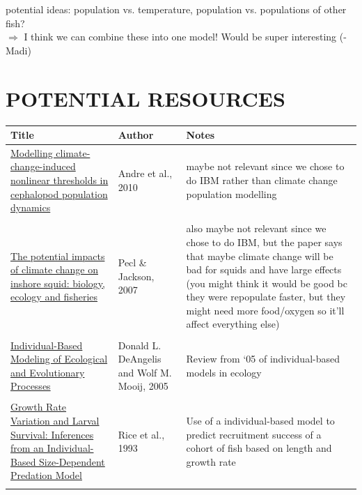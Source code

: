 \documentclass[12pt]{article}
\begin{document}
potential ideas: population vs. temperature, population vs. populations of other fish?
\\$\Rightarrow$ I think we can combine these into one model! Would be super interesting (-Madi)


\section{POTENTIAL RESOURCES} %
\begin{longtable}{p{2.0in}|p{1.0in}|p{2.5in}}
    \centering
         Title  & Author & Notes \\ \hline
        \href{https://onlinelibrary.wiley.com/doi/abs/10.1111/j.1365-2486.2010.02223.x}{Modelling climate-change-induced nonlinear thresholds in cephalopod population dynamics} & Andre et al., 2010 & maybe not relevant since we chose to do IBM rather than climate change population modelling \\ \\
        \href{https://link.springer.com/article/10.1007/s11160-007-9077-3}{The potential impacts of climate change on inshore squid: biology, ecology and fisheries} & Pecl \& Jackson, 2007 & also maybe not relevant since we chose to do IBM, but the paper says that maybe climate change will be bad for squids and have large effects (you might think it would be good bc they were repopulate faster, but they might need more food/oxygen so it'll affect everything else) \\ \\
        \href{https://www.annualreviews.org/content/journals/10.1146/annurev.ecolsys.36.102003.152644}{Individual-Based Modeling of Ecological and Evolutionary Processes} & Donald L. DeAngelis and Wolf M. Mooij, 2005 &  Review from `05 of individual-based models in ecology \\ \\

        \href{https://cdnsciencepub.com/doi/abs/10.1139/f93-015}{Growth Rate Variation and Larval Survival: Inferences from an Individual-Based Size-Dependent Predation Model} & Rice et al., 1993 & Use of a individual-based model to predict recruitment success of a cohort of fish based on length and growth rate\\ \\


\end{longtable}
\end{document}
